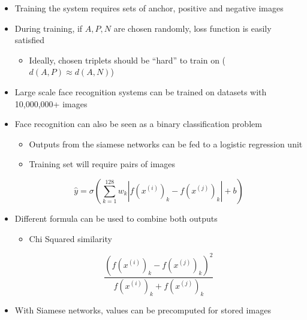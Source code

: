 \documentclass[12pt, letterpaper]{article}
\begin{document}
\begin{itemize}
        \item Training the system requires sets of anchor, positive and negative images
        \item During training, if $A,P,N$ are chosen randomly, loss function is easily satisfied
        \begin{itemize}
            \item Ideally, chosen triplets should be ``hard'' to train on ($d(A,P)\approx d(A,N)$)
        \end{itemize}
        \item Large scale face recognition systems can be trained on datasets with 10,000,000+ images
        \item Face recognition can also be seen as a binary classification problem
        \begin{itemize}
            \item Outputs from the siamese networks can be fed to a logistic regression unit
            \item Training set will require pairs of images
        \end{itemize}
        $$\hat{y}=\sigma\left(\sum_{k=1}^{128}w_k|f(x^{(i)})_k-f(x^{(j)})_k|+b\right)$$
        \item Different formula can be used to combine both outputs
        \begin{itemize}
            \item Chi Squared similarity
        \end{itemize}
        $$\frac{\left(f(x^{(i)})_k-f(x^{(j)})_k\right)^2}{f(x^{(i)})_k+f(x^{(j)})_k}$$
        \item With Siamese networks, values can be precomputed for stored images
    \end{itemize}
\end{document}
